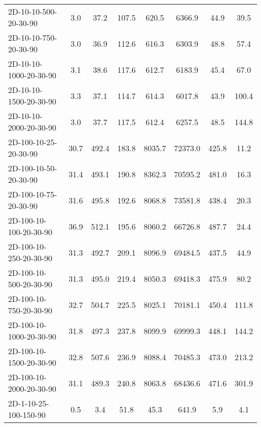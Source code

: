 \documentclass{article}
\begin{document}
\begin{table}[h]
\begin{center}
\begin{tabular}{|l||c|c|c|c|c|c|c|}
            2D-10-10-500-20-30-90          & 3.0  & 37.2      & 107.5      & 620.5       & 6366.9   & 44.9      & 39.5       \\
            2D-10-10-750-20-30-90          & 3.0  & 36.9      & 112.6      & 616.3       & 6303.9   & 48.8      & 57.4       \\
            2D-10-10-1000-20-30-90         & 3.1  & 38.6      & 117.6      & 612.7       & 6183.9   & 45.4      & 67.0       \\
            2D-10-10-1500-20-30-90         & 3.3  & 37.1      & 114.7      & 614.3       & 6017.8   & 43.9      & 100.4      \\
            2D-10-10-2000-20-30-90         & 3.0  & 37.7      & 117.5      & 612.4       & 6257.5   & 48.5      & 144.8      \\
            \hline
            2D-100-10-25-20-30-90          & 30.7 & 492.4     & 183.8      & 8035.7      & 72373.0  & 425.8     & 11.2       \\
            2D-100-10-50-20-30-90          & 31.4 & 493.1     & 190.8      & 8362.3      & 70595.2  & 481.0     & 16.3       \\
            2D-100-10-75-20-30-90          & 31.6 & 495.8     & 192.6      & 8068.8      & 73581.8  & 438.4     & 20.3       \\
            2D-100-10-100-20-30-90         & 36.9 & 512.1     & 195.6      & 8060.2      & 66726.8  & 487.7     & 24.4       \\
            2D-100-10-250-20-30-90         & 31.3 & 492.7     & 209.1      & 8096.9      & 69484.5  & 437.5     & 44.9       \\
            2D-100-10-500-20-30-90         & 31.3 & 495.0     & 219.4      & 8050.3      & 69418.3  & 475.9     & 80.2       \\
            2D-100-10-750-20-30-90         & 32.7 & 504.7     & 225.5      & 8025.1      & 70181.1  & 450.4     & 111.8      \\
            2D-100-10-1000-20-30-90        & 31.8 & 497.3     & 237.8      & 8099.9      & 69999.3  & 448.1     & 144.2      \\
            2D-100-10-1500-20-30-90        & 32.8 & 507.6     & 236.9      & 8088.4      & 70485.3  & 473.0     & 213.2      \\
            2D-100-10-2000-20-30-90        & 31.1 & 489.3     & 240.8      & 8063.8      & 68436.6  & 471.6     & 301.9      \\
            \hline
            2D-1-10-25-100-150-90          & 0.5  & 3.4       & 51.8       & 45.3        & 641.9    & 5.9       & 4.1        \\

\end{tabular}
\end{center}
\end{table}
\end{document}
